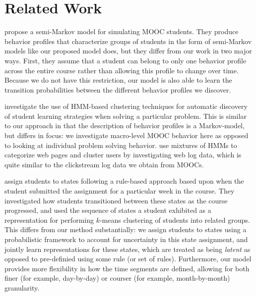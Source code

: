 \section{Related Work}

\citet{Faucon:2016:EDM} propose a semi-Markov model for simulating MOOC
students. They produce behavior profiles that characterize groups of
students in the form of semi-Markov models like our proposed model does,
but they differ from our work in two major ways. First, they assume that a
student can belong to only one behavior profile across the entire course
rather than allowing this profile to change over time.  Because we do not
have this restriction, our model is also able to learn the transition
probabilities between the different behavior profiles we discover.

\citet{Shih:2010:EDM} investigate the use of HMM-based clustering
techniques for automatic discovery of student learning strategies when
solving a particular problem. This is similar to our approach in that the
description of behavior profiles is a Markov-model, but differs in focus:
we investigate macro-level MOOC behavior here as opposed to looking at
individual problem solving behavior. \citet{Ypma:2002:Springer} use
mixtures of HMMs to categorize web pages and cluster users by investigating
web log data, which is quite similar to the clickstream log data we obtain
from MOOCs.

\citet{Kizilcec:2013:LAK} assign students  to states following a rule-based
approach based upon when the student submitted the assignment for a
particular week in the course. They investigated how students transitioned
between these states as the course progressed, and used the sequence of
states a student exhibited as a representation for performing $k$-means
clustering of students into related groups. This differs from our method
substantially: we assign students to states using a probabilistic
framework to account for uncertainty in this state assignment, and jointly
learn representations for these states, which are treated as being
\emph{latent} as opposed to pre-definied using some rule (or set of rules).
Furthermore, our model provides more flexibility in how the time segments
are defined, allowing for both finer (for example, day-by-day) or courser
(for example, month-by-month) granularity.
